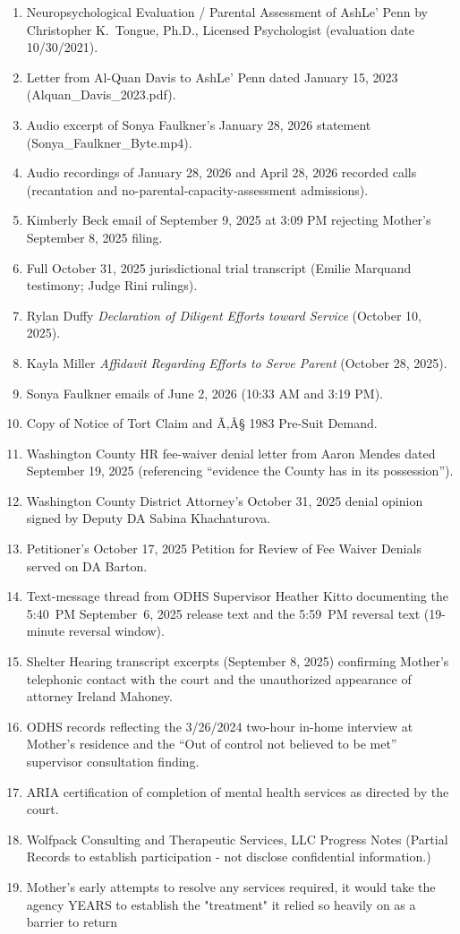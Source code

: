 \documentclass[10pt,a4paper,roman]{moderncv}
\begin{document}
	\begin{enumerate}[label=\textbf{Exhibit \Alph*.},leftmargin=*,itemsep=0.2em,topsep=0.2em]
		\item Neuropsychological Evaluation / Parental Assessment of AshLe' Penn by Christopher K.~Tongue, Ph.D., Licensed Psychologist (evaluation date 10/30/2021).
		\item Letter from Al-Quan Davis to AshLe' Penn dated January 15, 2023 (Alquan\_Davis\_2023.pdf).
		\item Audio excerpt of Sonya Faulkner's January 28, 2026 statement (Sonya\_Faulkner\_Byte.mp4).
		\item Audio recordings of January 28, 2026 and April 28, 2026 recorded calls (recantation and no-parental-capacity-assessment admissions).
		\item Kimberly Beck email of September 9, 2025 at 3:09 PM rejecting Mother's September 8, 2025 filing.
		\item Full October 31, 2025 jurisdictional trial transcript (Emilie Marquand testimony; Judge Rini rulings).
		\item Rylan Duffy \emph{Declaration of Diligent Efforts toward Service} (October 10, 2025).
		\item Kayla Miller \emph{Affidavit Regarding Efforts to Serve Parent} (October 28, 2025).
		\item Sonya Faulkner emails of June 2, 2026 (10:33 AM and 3:19 PM).
		\item Copy of Notice of Tort Claim and Ã‚Â§ 1983 Pre-Suit Demand.
		\item Washington County HR fee-waiver denial letter from Aaron Mendes dated September 19, 2025 (referencing ``evidence the County has in its possession'').
		\item Washington County District Attorney's October 31, 2025 denial opinion signed by Deputy DA Sabina Khachaturova.
		\item Petitioner's October 17, 2025 Petition for Review of Fee Waiver Denials served on DA Barton.
		\item Text-message thread from ODHS Supervisor Heather Kitto documenting the 5:40~PM September~6, 2025 release text and the 5:59~PM reversal text (19-minute reversal window).
		\item Shelter Hearing transcript excerpts (September 8, 2025) confirming Mother's telephonic contact with the court and the unauthorized appearance of attorney Ireland Mahoney.
		\item ODHS records reflecting the 3/26/2024 two-hour in-home interview at Mother's residence and the ``Out of control not believed to be met'' supervisor consultation finding.
		\item ARIA certification of completion of mental health services as directed by the court.
		\item Wolfpack Consulting and Therapeutic Services, LLC Progress Notes (Partial Records to establish participation - not disclose confidential information.)
		\item Mother's early attempts to resolve any services required, it would take the agency YEARS to establish the "treatment" it relied so heavily on as a barrier to return
	\end{enumerate}
	
\end{document}
